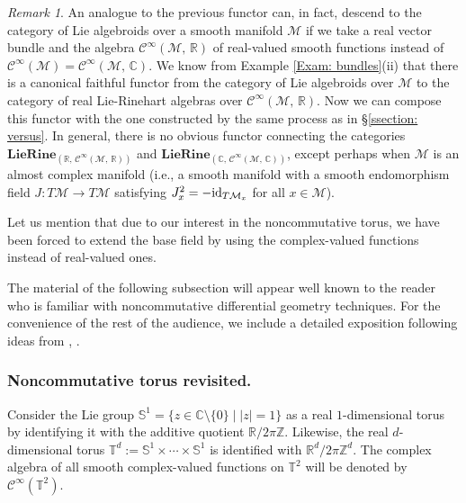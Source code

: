 \documentclass[reqno, a4paper, 10pt]{amsart}
\numberwithin{equation}{section}
\theoremstyle{plain}
\theoremstyle{definition}
\theoremstyle{remark}
\newtheorem{rem}{Remark}
\begin{document}
\begin{rem}\label{remark:field extension problem}
An analogue to the previous functor can, in fact, descend to the category of Lie algebroids 
over a smooth manifold ${{\mathcal M}}$ if we take a real vector bundle and the algebra ${{\mathcal C}}^{\infty}({{\mathcal M}},\, \mathbb{R})$  
of real-valued smooth functions instead of ${{\mathcal C}}^\infty({{\mathcal M}}) = {{\mathcal C}}^{\infty}({{\mathcal M}},\, \mathbb{C})$. 
We know from  Example \ref{Exam: bundles}(ii) that there is a  canonical faithful functor 
 from the category of Lie algebroids over ${{\mathcal M}}$ to the category of real Lie-Rinehart algebras over ${{\mathcal C}}^{\infty}({{\mathcal M}},\, \mathbb{R})$. 
Now we can compose this functor with the one constructed by the same process as in \S\ref{ssection: versus}.  
In general, there is no obvious functor connecting the categories  $\mathbf{LieRine}_{(\mathbb{R},\, {{\mathcal C}}^
 {\infty}({{\mathcal M}},\, \mathbb{R}))}$ and  $\mathbf{LieRine}_{(\mathbb{C},\, {{\mathcal C}}^{\infty}({{\mathcal M}},\, \mathbb{C}))}$, except perhaps when ${{\mathcal M}}$ is an almost complex manifold (i.e., a smooth manifold with a smooth endomorphism field $J: T{{\mathcal M}} \to T{{\mathcal M}}$ satisfying $J_x^2=-{{\rm id}}_{T{{\mathcal M}}_x}$ for all $x\in {{\mathcal M}}$).

Let us mention that due to our interest in the noncommutative torus,  we  have been forced to extend  the base field by using the complex-valued functions instead of real-valued ones. 
\end{rem}

The material of the following subsection will appear well known to the reader who is familiar with noncommutative differential geometry techniques. 
For the convenience of the rest of the audience,  we include a detailed exposition following ideas from \cite[\S3.1]{DKMM:2001}, \cite[\S1.1]{Khalkhali:book}.

\subsubsection{Noncommutative torus revisited.}\label{ssubsec:Tq}
Consider the Lie group $\mathbb{S}^1=\{z \in \mathbb{C}\setminus \{0\} \mid |z|= 1\}$ as a real $1$-dimensional torus by identifying it with the additive quotient $\mathbb{R}/2\pi \mathbb{Z}$. 
Likewise, the real $d$-dimensional torus $\mathbb{T}^d := \mathbb{S}^1 \times \cdots \times \mathbb{S}^1$ is identified with $\mathbb{R}^d/2\pi\mathbb{Z}^d$. The complex algebra of all smooth complex-valued functions on $\mathbb{T}^2$ will be denoted by ${{\mathcal C}}^{\infty}(\mathbb{T}^2)$.
\end{document}
